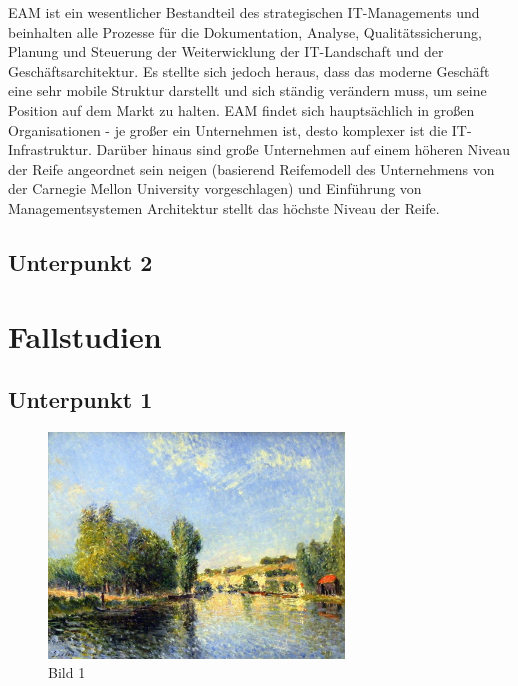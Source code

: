 \documentclass[
	A4paper,
	DIV=9,
	BCOR7mm,
	smallheadings,
	headinclude,
	footinclude,
	headsepline,
	parindent,
	german,
	captions=tableheading,
	abstracton
	]{scrreprt}
\begin{document}
EAM ist ein wesentlicher Bestandteil des strategischen IT-Managements und beinhalten alle Prozesse für die Dokumentation, Analyse, Qualitätssicherung, Planung und Steuerung der Weiterwicklung der IT-Landschaft und der Geschäftsarchitektur.
Es stellte sich jedoch heraus, dass das moderne Geschäft eine sehr mobile Struktur darstellt und sich ständig verändern muss, um seine Position auf dem Markt zu halten.
EAM findet sich hauptsächlich in großen Organisationen - je großer ein Unternehmen ist, desto komplexer ist die IT-Infrastruktur. Darüber hinaus sind große Unternehmen auf einem höheren Niveau der Reife angeordnet sein neigen (basierend Reifemodell des Unternehmens von der Carnegie Mellon University vorgeschlagen) und Einführung von Managementsystemen Architektur stellt das höchste Niveau der Reife. 

\blindtext[2]{}\autocite{:Aydin_2009}

\blindtext[2]{}\autocite{:Wintermantel_Medizintechnik}

\blindtext[1]{}\autocite{:Muelhardt_2013}
\section{Unterpunkt 2}
\blindtext[1]{}

\blindtext[2]{}

\blindtext[2]{}

\blindtext[1]{}
\chapter{Fallstudien}
\section{Unterpunkt 1}


\blindtext[1]{}\autocite{:Geschwinde_Rauschdrogen}

\blindtext[2]{}\blindtext[1]{}\autocite{:Muelhardt_2013}
\begin{figure}[htbp]
\begin{center}
\includegraphics[width=0.7\textwidth]{Abbildungen/Bild1.jpg}
\caption{Bild 1}
\label{fig:Bild1}
\end{center}
\end{figure}
\end{document}
